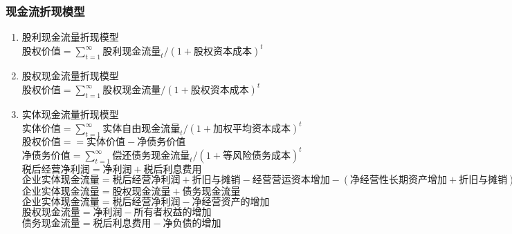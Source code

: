 \documentclass[11pt]{article}
\begin{document}
\subsubsection{现金流折现模型}
\label{sec:org2c828fd}
\begin{enumerate}
\item 股利现金流量折现模型
\label{sec:org6c397f1}
\(股权价值=\sum\limits_{t=1}^{\infty}股利现金流量_{t}/(1+股权资本成本)^{t}\)
\item 股权现金流量折现模型
\label{sec:org62e423f}
\(股权价值=\sum\limits_{t=1}^{\infty}股权现金流量/(1+股权资本成本)^{t}\)
\item 实体现金流量折现模型
\label{sec:org4c4f471}
\(实体价值=\sum\limits_{t=1}^{\infty}实体自由现金流量_{t}/(1+加权平均资本成本)^{t}\)
\(股权价值==实体价值-净债务价值\)
\(净债务价值=\sum\limits_{t=1}^{\infty}偿还债务现金流量_{t}/(1+等风险债务成本)^{t}\)
\(税后经营净利润 = 净利润 + 税后利息费用\)
\(企业实体现金流量 = 税后经营净利润 + 折旧与摊销 - 经营营运资本增加 - (净经营性长期资产增加 + 折旧与摊销)\)
\(企业实体现金流量 = 股权现金流量 + 债务现金流量\)
\(企业实体现金流量 = 税后经营净利润 - 净经营资产的增加\)
\(股权现金流量 = 净利润 - 所有者权益的增加\)
\(债务现金流量 = 税后利息费用 - 净负债的增加\)
\end{enumerate}
\end{document}
